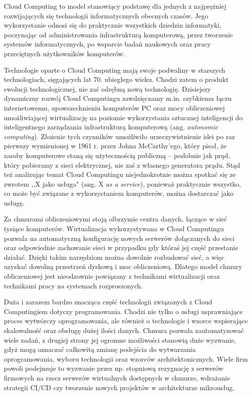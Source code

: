 \documentclass[12pt,a4paper,twoside,titlepage,openright]{book}
\begin{document}
Cloud Computing to model stanowiący podstawę dla jednych z najprężniej rozwijających się technologii informatycznych obecnych czasów. Jego wykorzystanie odnosi się do praktycznie wszystkich dziedzin informatyki, poczynając od administrowania infrastrukturą komputerową, przez tworzenie systemów informatycznych, po wsparcie badań naukowych oraz pracy przeciętnych użytkowników komputerów. 

Technologie oparte o Cloud Computing mają swoje podwaliny w starszych technologiach, sięgających lat 70. ubiegłego wieku. Chodzi zatem o produkt ewolucji technologicznej, nie zaś odrębną nową technologię. Dzisiejszy dynamiczny rozwój Cloud Computingu zawdzięczamy m.in. szybkiemu łączu internetowemu, upowszechnieniu komputerów PC oraz mocy obliczeniowej umożliwiającej wirtualizację na poziomie wykorzystania sztucznej inteligencji do inteligentnego zarządzania infrastrukturą komputerową (ang. \textit{autonomic computing}). Złożenie tych czynników umożliwiło urzeczywistnienie idei po raz pierwszy wymienionej w 1961 r. przez Johna McCarthy'ego, który pisał, że zasoby komputerowe staną się użytecznością publiczną -- podobnie jak prąd, który pobieramy z sieci elektrycznej, nie zaś z własnego generatora prądu.\cite{ccCambridge,ccSpringer} Stąd też analizując temat Cloud Computingu niejednokrotnie można spotkać się ze zwrotem ,,X jako usługa" (ang. X \textit{as a service}), ponieważ praktycznie wszystko, co może być związane z wykorzystaniem komputerów, można dostarczać jako usługę. \cite{ccCambridge}

Za chmurami obliczeniowymi stoją olbrzymie centra danych, łączące w sieć tysiące komputerów. Wirtualizacja wykorzystywana w Cloud Computingu pozwala na automatyczną konfigurację nowych serwerów dołączanych do sieci oraz odpowiednie zachowanie sieci w przypadku gdy któraś jej część przestanie działać. Dzięki takim narzędziom można dowolnie rozbudować sieć, a więc uzyskać dowolną przestrzeń dyskową i moc obliczeniową. Dlatego model chmury obliczeniowej jest nieodzownie powiązany z technikami wirtualizacji oraz technikami pracy na systemach rozproszonych.

Duża i zarazem bardzo znacząca część technologii związanych z Cloud Computingiem dotyczy programowania. Chodzi nie tylko o usługi usprawniające proces wytwórczy oprogramowania, ale również o technologie i wzorce wspierające skalowalność oraz obsługę dużej ilości danych. Chmura pozwala zautomatyzować wiele zadań, z drugiej strony jej ogromne możliwości stanowią duże wyzwanie, gdyż mogą oznaczać całkowitą zmianę podejścia do wytwarzania oprogramowania, wyboru technologii oraz wzorców architektonicznych. Wiele firm powoli podejmuje to wyzwanie przez np. stopniową rezygnację z serwerów firmowych na rzecz serwerów wirtualnych dostępnych w chmurze, wdrażanie strategii CI/CD czy tworzenie nowych projektów w architekturze mikrousług. 
\end{document}
